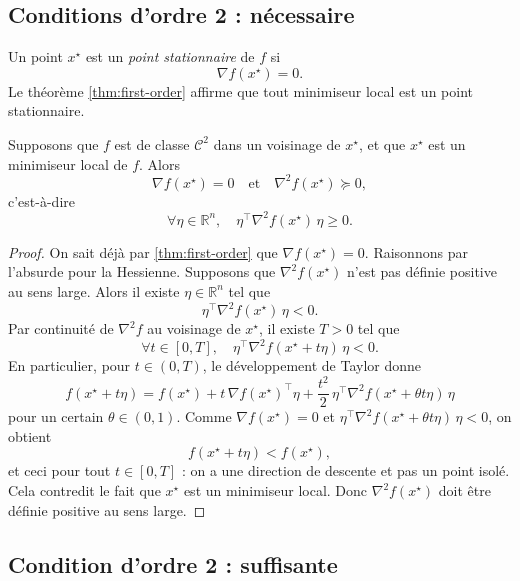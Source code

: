 \subsection{Conditions d’ordre 2 : nécessaire}
\label{subsec:2.2.3}

\begin{definition}
Un point $x^\star$ est un \emph{point stationnaire} de $f$ si
\[
    \nabla f(x^\star) = 0.
\]
Le théorème \ref{thm:first-order} affirme que tout minimiseur local est un point
stationnaire.
\end{definition}

\begin{theoreme}
\label{thm:second-order-necessary}
Supposons que $f$ est de classe $\mathcal{C}^2$ dans un voisinage de $x^\star$,
et que $x^\star$ est un minimiseur local de $f$. Alors
\[
    \nabla f(x^\star) = 0
    \quad\text{et}\quad
    \nabla^2 f(x^\star) \succeq 0,
\]
c’est-à-dire
\[
    \forall \eta \in \mathbb{R}^n,\quad
    \eta^\top \nabla^2 f(x^\star)\,\eta \ge 0.
\]
\end{theoreme}

\begin{proof}
On sait déjà par \autoref{thm:first-order} que $\nabla f(x^\star)=0$.
Raisonnons par l’absurde pour la Hessienne. Supposons que $\nabla^2 f(x^\star)$
n’est pas définie positive au sens large. Alors il existe $\eta \in \mathbb{R}^n$
tel que
\[
    \eta^\top \nabla^2 f(x^\star)\,\eta < 0.
\]
Par continuité de $\nabla^2 f$ au voisinage de $x^\star$, il existe $T>0$ tel que
\[
    \forall t \in [0,T],\quad
    \eta^\top \nabla^2 f(x^\star + t\eta)\,\eta < 0.
\]
En particulier, pour $t\in(0,T)$, le développement de Taylor donne
\[
    f(x^\star + t\eta)
    = f(x^\star) + t\,\nabla f(x^\star)^\top \eta
      + \frac{t^2}{2}\,\eta^\top \nabla^2 f(x^\star + \theta t\eta)\,\eta
\]
pour un certain $\theta \in (0,1)$. Comme $\nabla f(x^\star)=0$ et
$\eta^\top \nabla^2 f(x^\star + \theta t\eta)\,\eta < 0$, on obtient
\[
    f(x^\star + t\eta) < f(x^\star),
\]
et ceci pour tout $t \in [0,T]$ : on a une direction de descente et pas un point isolé. Cela contredit le fait que $x^\star$ est un minimiseur local.
Donc $\nabla^2 f(x^\star)$ doit être définie positive au sens large.
\end{proof}

\subsection{Condition d’ordre 2 : suffisante}
\label{subsec:2.2.4}


